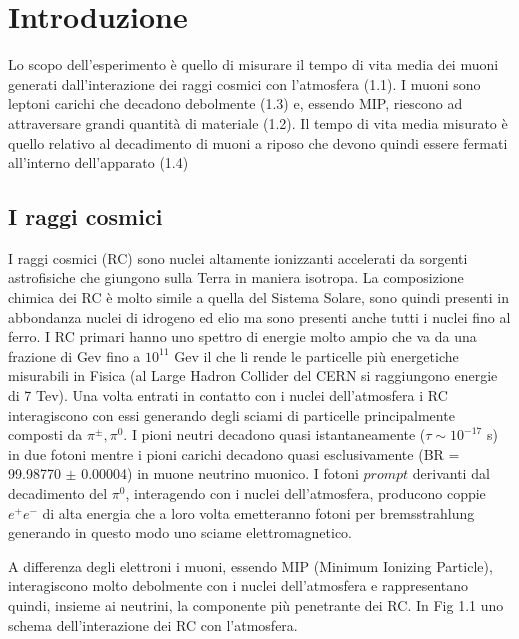 \documentclass[12pt,a4paper]{report}
\begin{document}
	\pagestyle{fancy}
	\lhead{\rightmark}
	\rhead{\thepage}

\chapter{Introduzione}
Lo scopo dell'esperimento è quello di misurare il tempo di vita media dei muoni generati dall'interazione dei raggi cosmici con l'atmosfera (1.1). I muoni sono leptoni carichi che decadono debolmente (1.3) e, essendo MIP, riescono ad attraversare grandi quantità di materiale (1.2). Il tempo di vita media misurato è quello relativo al decadimento di muoni a riposo che devono quindi essere fermati all'interno dell'apparato (1.4)

\section{I raggi cosmici}
I raggi cosmici (RC) sono nuclei altamente ionizzanti accelerati da sorgenti astrofisiche che giungono sulla Terra in maniera isotropa. La composizione chimica dei RC è molto simile a quella del Sistema Solare, sono quindi presenti in abbondanza nuclei di idrogeno ed elio ma sono presenti anche tutti i nuclei fino al ferro.
I RC primari hanno uno spettro di energie molto ampio che va da una frazione di Gev fino a $10^{11}$ Gev il che li rende le particelle più energetiche misurabili in Fisica (al Large Hadron Collider del CERN si raggiungono energie di 7 Tev).
Una volta entrati in contatto con i nuclei dell'atmosfera i RC interagiscono con essi generando degli sciami di particelle principalmente composti da $\pi^\pm, \pi^0$.
I pioni neutri decadono quasi istantaneamente ($\tau \sim 10^{-17}$ s) in due fotoni mentre i pioni carichi decadono quasi esclusivamente (BR = 99.98770 $\pm$ 0.00004) in muone neutrino muonico.
I fotoni $prompt$ derivanti dal decadimento del $\pi^0$, interagendo con i nuclei dell'atmosfera, producono coppie $e^+e^-$ di alta energia che a loro volta emetteranno fotoni per bremsstrahlung generando in questo modo uno sciame elettromagnetico.

A differenza degli elettroni i muoni, essendo MIP (Minimum Ionizing Particle), interagiscono molto debolmente con i nuclei dell'atmosfera e rappresentano quindi, insieme ai neutrini, la componente più penetrante dei RC. In Fig 1.1 uno schema dell'interazione dei RC con l'atmosfera.
\end{document}
